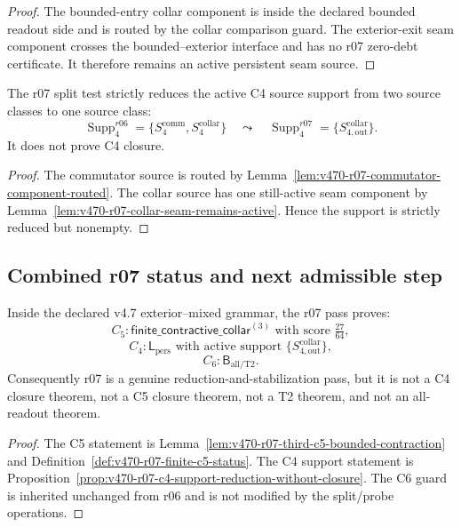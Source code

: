 \begin{proof}
The bounded-entry collar component is inside the declared bounded readout side
and is routed by the collar comparison guard.  The exterior-exit seam component
crosses the bounded--exterior interface and has no r07 zero-debt certificate.  It
therefore remains an active persistent seam source.
\end{proof}

\begin{proposition}
\label{prop:v470-r07-c4-support-reduction-without-closure}
The r07 split test strictly reduces the active C4 source support from two source
classes to one source class:
\[
\operatorname{Supp}_{4}^{r06}
=
\{S_4^{\mathrm{comm}},S_4^{\mathrm{collar}}\}
\quad\leadsto\quad
\operatorname{Supp}_{4}^{r07}
=
\{S_{4,\mathrm{out}}^{\mathrm{collar}}\}.
\]
It does not prove C4 closure.
\end{proposition}

\begin{proof}
The commutator source is routed by Lemma~\ref{lem:v470-r07-commutator-component-routed}.
The collar source has one still-active seam component by
Lemma~\ref{lem:v470-r07-collar-seam-remains-active}.  Hence the support is
strictly reduced but nonempty.
\end{proof}

\subsection{Combined r07 status and next admissible step}
\label{subsec:v470-r07-combined-status-next-step}

\begin{theorem}
\label{thm:v470-r07-split-probe-theorem}
Inside the declared v4.7 exterior--mixed grammar, the r07 pass proves:
\[
C_5:
\mathsf{finite\_contractive\_collar}^{(3)}
\text{ with score }\tfrac{27}{64},
\]
\[
C_4:
\mathsf L_{\mathrm{pers}}
\text{ with active support }
\{S_{4,\mathrm{out}}^{\mathrm{collar}}\},
\]
\[
C_6:
\mathsf B_{\mathrm{all/T2}}.
\]
Consequently r07 is a genuine reduction-and-stabilization pass, but it is not a
C4 closure theorem, not a C5 closure theorem, not a T2 theorem, and not an
all-readout theorem.
\end{theorem}

\begin{proof}
The C5 statement is Lemma~\ref{lem:v470-r07-third-c5-bounded-contraction} and
Definition~\ref{def:v470-r07-finite-c5-status}.  The C4 support statement is
Proposition~\ref{prop:v470-r07-c4-support-reduction-without-closure}.  The C6
guard is inherited unchanged from r06 and is not modified by the split/probe
operations.
\end{proof}

